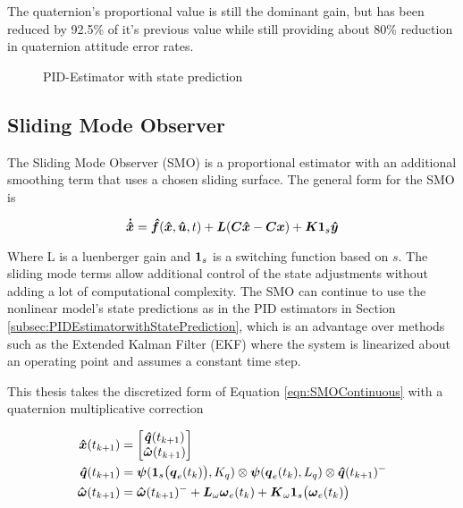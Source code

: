 The quaternion's proportional value is still the dominant gain, but has been reduced by 92.5\% of it's previous value while still providing about 80\% reduction in quaternion attitude error rates.

\begin{figure}[H]
  \centerline{}
  \caption{PID-Estimator with state prediction}
  \label{fig:PIDEstimatorwithstateprediction}
\end{figure}


\subsection{Sliding Mode Observer}
\label{subsec:SlidingModeObserver}

The Sliding Mode Observer (SMO) is a proportional estimator with an additional smoothing term that uses a chosen sliding surface.  The general form for the SMO is

\begin{equation}
  \boldsymbol{\dot{\hat{x}}} = \boldsymbol{\hat{f}}(\boldsymbol{\hat{x}}, \boldsymbol{\hat{u}}, t) + \boldsymbol{L}(\boldsymbol{C}\boldsymbol{\hat{x}} - \boldsymbol{C}\boldsymbol{x}) + \boldsymbol{K}\boldsymbol{1}_s\boldsymbol{\hat{y}}
  \label{eqn:SMOContinuous}
\end{equation}

Where L is a luenberger gain and $\boldsymbol{1}_s$ is a switching function based on $s$.  The sliding mode terms allow additional control of the state adjustments without adding a lot of computational complexity.  The SMO can continue to use the nonlinear model's state predictions as in the PID estimators in Section \ref{subsec:PIDEstimatorwithStatePrediction}, which is an advantage over methods such as the Extended Kalman Filter (EKF) where the system is linearized about an operating point and assumes a constant time step.

This thesis takes the discretized form of Equation \ref{eqn:SMOContinuous} with a quaternion multiplicative correction

\begin{subequations}
  \begin{align}
    \boldsymbol{\hat{x}}(t_{k+1}) &= \begin{bmatrix} \boldsymbol{\hat{q}}(t_{k+1}) \\ \boldsymbol{\hat{\omega}}(t_{k+1}) \end{bmatrix} \\
    \boldsymbol{\hat{q}}(t_{k+1}) &= \boldsymbol{\psi} (\boldsymbol{1}_s\big(\boldsymbol{q}_{e}(t_k)\big), K_q) \otimes \boldsymbol{\psi}(\boldsymbol{q}_e(t_{k}), L_{q})  \otimes \boldsymbol{\hat{q}}(t_{k+1})^- \\
    \boldsymbol{\hat{\omega}}(t_{k+1}) &= \boldsymbol{\hat{\omega}}(t_{k+1})^- + \boldsymbol{L}_{\omega} \boldsymbol{\omega}_e(t_{k}) + \boldsymbol{K}_{\omega}\boldsymbol{1}_s \big(\boldsymbol{\omega}_e(t_{k}) \big)
  \end{align}
  \label{eqn:SMOEstimatorwithPredictionUnforcedMotion}
\end{subequations}

